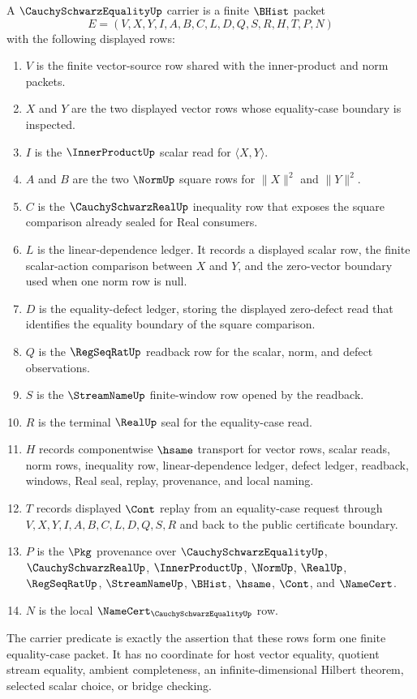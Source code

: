 \begin{definition}
\label{def:cauchy-schwarz-equality-carrier}
A $\CauchySchwarzEqualityUp$ carrier is a finite $\BHist$ packet
$$
E=(V,X,Y,I,A,B,C,L,D,Q,S,R,H,T,P,N)
$$
with the following displayed rows:
\begin{enumerate}
\item $V$ is the finite vector-source row shared with the inner-product and norm packets.
\item $X$ and $Y$ are the two displayed vector rows whose equality-case boundary is inspected.
\item $I$ is the $\InnerProductUp$ scalar read for $\langle X,Y\rangle$.
\item $A$ and $B$ are the two $\NormUp$ square rows for $\|X\|^2$ and $\|Y\|^2$.
\item $C$ is the $\CauchySchwarzRealUp$ inequality row that exposes the square comparison already sealed for Real consumers.
\item $L$ is the linear-dependence ledger. It records a displayed scalar row, the finite scalar-action comparison between $X$ and $Y$, and the zero-vector boundary used when one norm row is null.
\item $D$ is the equality-defect ledger, storing the displayed zero-defect read that identifies the equality boundary of the square comparison.
\item $Q$ is the $\RegSeqRatUp$ readback row for the scalar, norm, and defect observations.
\item $S$ is the $\StreamNameUp$ finite-window row opened by the readback.
\item $R$ is the terminal $\RealUp$ seal for the equality-case read.
\item $H$ records componentwise $\hsame$ transport for vector rows, scalar reads, norm rows, inequality row, linear-dependence ledger, defect ledger, readback, windows, Real seal, replay, provenance, and local naming.
\item $T$ records displayed $\Cont$ replay from an equality-case request through $V,X,Y,I,A,B,C,L,D,Q,S,R$ and back to the public certificate boundary.
\item $P$ is the $\Pkg$ provenance over $\CauchySchwarzEqualityUp$, $\CauchySchwarzRealUp$, $\InnerProductUp$, $\NormUp$, $\RealUp$, $\RegSeqRatUp$, $\StreamNameUp$, $\BHist$, $\hsame$, $\Cont$, and $\NameCert$.
\item $N$ is the local $\NameCert_{\CauchySchwarzEqualityUp}$ row.
\end{enumerate}
The carrier predicate is exactly the assertion that these rows form one finite equality-case packet. It has no coordinate for host vector equality, quotient stream equality, ambient completeness, an infinite-dimensional Hilbert theorem, selected scalar choice, or bridge checking.
\end{definition}

